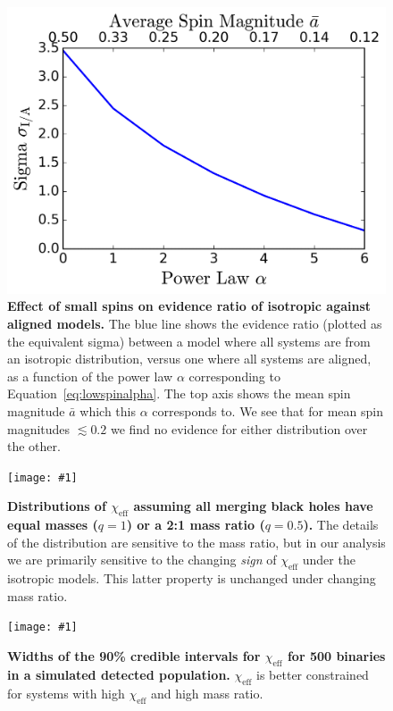 \documentclass{nature-arxiv}
\newcommand{\chieff}{\chi_\mathrm{eff}}
\newcommand{\plotone}[1]{\texttt{[image: \#1]}}
\begin{document}
\begin{methods}
\begin{figure}
\centering
\includegraphics[width=\textwidth]{../plots/sigma_v_alpha_GW170104.png}
\caption{\textbf{Effect of small spins on evidence ratio of isotropic against
  aligned models.} The blue line shows the evidence ratio
  (plotted as the equivalent sigma) between a model where all systems
  are from an isotropic distribution, versus one where all systems are
  aligned, as a function of the power law $\alpha$ corresponding
  to Equation~\ref{eq:lowspinalpha}.  The top axis shows the mean spin
  magnitude $\bar{a}$ which this $\alpha$ corresponds to. We see that
  for mean spin magnitudes $\lesssim 0.2$ we find no evidence for
  either distribution over the other.}
\label{fig:smallspinsalpha}
\end{figure}

\begin{figure}
  \plotone{../plots/chi-eff-distributions-q05}
  \caption{\textbf{Distributions of $\chieff$ assuming all merging
      black holes have equal masses ($q=1$) or a 2:1 mass ratio
      ($q = 0.5$).}  The details of the distribution are sensitive to
    the mass ratio, but in our analysis we are primarily sensitive to
    the changing \emph{sign} of $\chieff$ under the isotropic models.
    This latter property is unchanged under changing mass ratio.}
  \label{fig:mass-ratio-sensitivity}
\end{figure}

\begin{figure}
  \plotone{../plots/chi-eff-90cl}
  \caption{\textbf{Widths of the 90\% credible intervals for $\chieff$
      for 500 binaries in a simulated detected population.} $\chieff$
    is better constrained for systems with high $\chieff$ and high mass
    ratio.}
  \label{fig:chi-eff-constraints}
\end{figure}

\end{methods}

%
%
\end{document}
